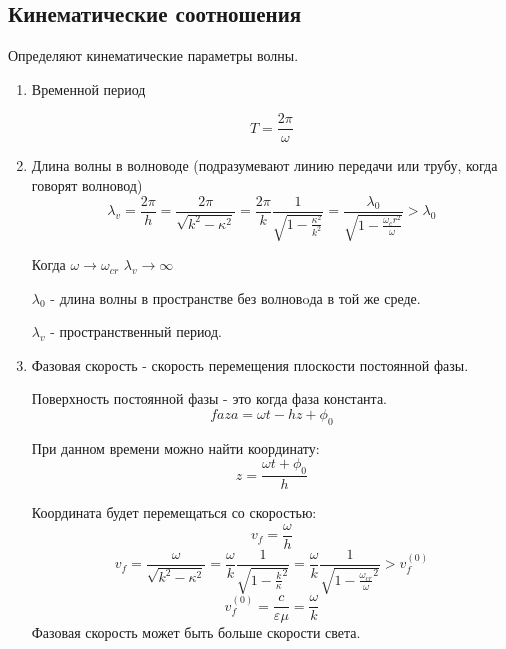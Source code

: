 \subsection{Кинематические соотношения}
Определяют кинематические параметры волны.

\begin{enumerate}
	\item Временной период 

	\begin{equation}
		T = \frac{2 \pi}{\omega}
	\end{equation}

	\item Длина волны в волноводе (подразумевают линию передачи или трубу, когда говорят волновод)
	\begin{equation}
		\lambda_v = \frac{2 \pi}{h} = \frac{2 \pi}{\sqrt{k^2 - \kappa^2}} = \frac{2 \pi}{k} \frac{1}{\sqrt{1 - \frac{\kappa^2}{k^2}}} = \frac{\lambda_0}{\sqrt{1 - \frac{\omega_cr^2}{\omega}}} > \lambda_0
	\end{equation}

	Когда $\omega \rightarrow \omega_{cr}$	$\lambda_{v} \rightarrow \infty$

	$\lambda_0$ - длина волны в пространстве без волновoда в той же среде.

 	$\lambda_{v}$ - пространственный период.

 	\item Фазовая скорость - скорость перемещения плоскости постоянной фазы.

 	Поверхность постоянной фазы - это когда фаза константа.
 	\begin{equation}
 		faza = \omega t - h z + \phi_0
 	\end{equation}

 	При данном времени можно найти координату:
 	\begin{equation}
 		z = \frac{\omega t  + \phi_0}{ h }
 	\end{equation}

 	Координата будет перемещаться со скоростью:
 	\begin{equation}
 		v_f = \frac{\omega}{h}
 	\end{equation}
 	\begin{equation}
 		v_f = 
 		\frac{\omega}{\sqrt{k^2 - \kappa^2}} = 
 		\frac{\omega}{k} \frac{1}{\sqrt{1 - {\frac{k}{\kappa}^2}}} = \frac{\omega}{k} \frac{1}{\sqrt{1 - {\frac{\omega_{cr}}{\omega}^2}}} > v_f^{(0)}
	\end{equation}
	\begin{equation}
		v_f^{(0)} = \frac{c}{\varepsilon \mu} = \frac{\omega}{k}
	\end{equation}
 	Фазовая скорость может быть больше скорости света.


\end{enumerate}
